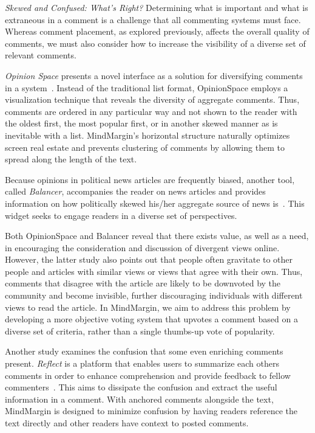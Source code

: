 \textit{Skewed and Confused: What’s Right?}
Determining what is important and what is extraneous in a comment is a challenge that all commenting systems must face. Whereas comment placement, as explored previously, affects the overall quality of comments, we must also consider how to increase the visibility of a diverse set of relevant comments. 

\textit{Opinion Space} presents a novel interface as a solution for diversifying comments in a system~\cite{OpinionSpace}. Instead of the traditional list format, OpinionSpace employs a visualization technique that reveals the diversity of aggregate comments. Thus, comments are ordered in any particular way and not shown to the reader with the oldest first, the most popular first, or in another skewed manner as is inevitable with a list. MindMargin’s horizontal structure naturally optimizes screen real estate and prevents clustering of comments by allowing them to spread along the length of the text. 

Because opinions in political news articles are frequently biased, another tool, called \textit{Balancer}, accompanies the reader on news articles and provides information on how politically skewed his/her aggregate source of news is~\cite{Politics}. This widget seeks to engage readers in a diverse set of perspectives. 

Both OpinionSpace and Balancer reveal that there exists value, as well as a need, in encouraging the consideration and discussion of divergent views online. However, the latter study also points out that people often gravitate to other people and articles with similar views or views that agree with their own. Thus, comments that disagree with the article are likely to be downvoted by the community and become invisible, further discouraging individuals with different views to read the article. In MindMargin, we aim to address this problem by developing a more objective voting system that upvotes a comment based on a diverse set of criteria, rather than a single thumbs-up vote of popularity. 

Another study examines the confusion that some even enriching comments present. \textit{Reflect} is a platform that enables users to summarize each others comments in order to enhance comprehension and provide feedback to fellow commenters~\cite{Reflect}. This aims to dissipate the confusion and extract the useful information in a comment. With anchored comments alongside the text, MindMargin is designed to minimize confusion by having readers reference the text directly and other readers have context to posted comments.


